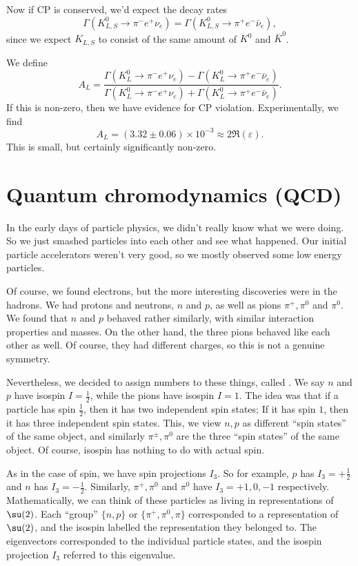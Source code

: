 \documentclass[a4paper]{article}
\begin{document}
Now if CP is conserved, we'd expect the decay rates
\[
  \Gamma(K_{L, S}^0 \to \pi^- e^+ \nu_e) = \Gamma(K_{L, S}^0 \to \pi^+ e^- \bar{\nu}_e),
\]
since we expect $K_{L, S}$ to consist of the same amount of $K^0$ and $\bar{K}^0$.

We define
\[
  A_L = \frac{\Gamma(K_L^0 \to \pi^- e^+ \nu_e) - \Gamma(K_L^0 \to \pi^+ e^- \bar{\nu}_e)}{\Gamma(K_L^0 \to \pi^- e^+ \nu_e) + \Gamma(K_L^0 \to \pi^+ e^- \bar{\nu}_e)}.
\]
If this is non-zero, then we have evidence for CP violation. Experimentally, we find
\[
  A_L = (3.32 \pm 0.06) \times 10^{-3} \approx 2 \Re (\varepsilon).
\]
This is small, but certainly significantly non-zero.


\section{Quantum chromodynamics (QCD)}
In the early days of particle physics, we didn't really know what we were doing. So we just smashed particles into each other and see what happened. Our initial particle accelerators weren't very good, so we mostly observed some low energy particles.

Of course, we found electrons, but the more interesting discoveries were in the hadrons. We had protons and neutrons, $n$ and $p$, as well as pions $\pi^+, \pi^0$ and $\pi^0$. We found that $n$ and $p$ behaved rather similarly, with similar interaction properties and masses. On the other hand, the three pions behaved like each other as well. Of course, they had different charges, so this is not a genuine symmetry.

Nevertheless, we decided to assign numbers to these things, called . We say $n$ and $p$ have isospin $I = \frac{1}{2}$, while the pions have isospin $I = 1$. The idea was that if a particle has spin $\frac{1}{2}$, then it has two independent spin states; If it has spin $1$, then it has three independent spin states. This, we view $n, p$ as different ``spin states'' of the same object, and similarly $\pi^{\pm}, \pi^0$ are the three ``spin states'' of the same object. Of course, isospin has nothing to do with actual spin.

As in the case of spin, we have spin projections $I_3$. So for example, $p$ has $I_3 = + \frac{1}{2}$ and $n$ has $I_3 = -\frac{1}{2}$. Similarly, $\pi^+, \pi^0$ and $\pi^0$ have $I_3 = +1, 0, -1$ respectively. Mathematically, we can think of these particles as living in representations of $\su(2)$. Each ``group'' $\{n, p\}$ or $\{\pi^+, \pi^0, \pi\}$ corresponded to a representation of $\su(2)$, and the isospin labelled the representation they belonged to. The eigenvectors corresponded to the individual particle states, and the isospin projection $I_3$ referred to this eigenvalue.
\end{document}

